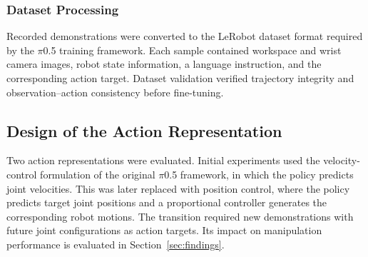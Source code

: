 \documentclass[conference, 12pt]{IEEEtran}
\begin{document}
\subsubsection{Dataset Processing}
Recorded demonstrations were converted to the LeRobot dataset format required by the $\pi$0.5 training framework. Each sample contained workspace and wrist camera images, robot state information, a language instruction, and the corresponding action target. Dataset validation verified trajectory integrity and observation–action consistency before fine-tuning.






\subsection{Design of the Action Representation}
Two action representations were evaluated. Initial experiments used the velocity-control formulation of the original $\pi$0.5 framework, in which the policy predicts joint velocities. This was later replaced with position control, where the policy predicts target joint positions and a proportional controller generates the corresponding robot motions. The transition required new demonstrations with future joint configurations as action targets. Its impact on manipulation performance is evaluated in Section~\ref{sec:findings}.
\end{document}
